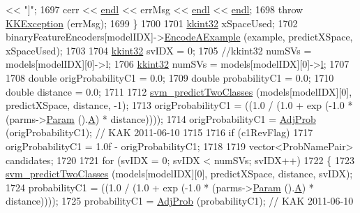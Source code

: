 \begin{DoxyCode}
       << \textcolor{stringliteral}{"]"};
1697     cerr << \hyperlink{namespace_k_k_b_ad1f50f65af6adc8fa9e6f62d007818a8}{endl} << errMsg << \hyperlink{namespace_k_k_b_ad1f50f65af6adc8fa9e6f62d007818a8}{endl} << \hyperlink{namespace_k_k_b_ad1f50f65af6adc8fa9e6f62d007818a8}{endl};
1698     \textcolor{keywordflow}{throw} \hyperlink{class_k_k_b_1_1_k_k_exception}{KKException} (errMsg);
1699   \}
1700 
1701   \hyperlink{namespace_k_k_b_a8fa4952cc84fda1de4bec1fbdd8d5b1b}{kkint32}  xSpaceUsed;
1702   binaryFeatureEncoders[modelIDX]->\hyperlink{class_k_k_m_l_l_1_1_feature_encoder_af82278dec57d34f3ebcf6ea97cc625d2}{EncodeAExample} (example, predictXSpace, xSpaceUsed);
1703 
1704   \hyperlink{namespace_k_k_b_a8fa4952cc84fda1de4bec1fbdd8d5b1b}{kkint32}  svIDX = 0;
1705   \textcolor{comment}{//kkint32  numSVs = models[modelIDX][0]->l;}
1706   \hyperlink{namespace_k_k_b_a8fa4952cc84fda1de4bec1fbdd8d5b1b}{kkint32}  numSVs = models[modelIDX][0]->\hyperlink{struct_s_v_m233_1_1_svm_model233_ae37947940a05ecebb1352b6f365b4050}{l};
1707 
1708   \textcolor{keywordtype}{double}  origProbabilityC1 = 0.0;
1709   \textcolor{keywordtype}{double}  probabilityC1     = 0.0;
1710   \textcolor{keywordtype}{double}  distance          = 0.0;
1711 
1712   \hyperlink{namespace_s_v_m233_a558a3dbd2873b3211831500197cc7a59}{svm\_predictTwoClasses} (models[modelIDX][0], predictXSpace, distance, -1);
1713   origProbabilityC1 = ((1.0 / (1.0 + exp (-1.0 * (parms->\hyperlink{class_k_k_m_l_l_1_1_binary_class_parms_a8b29f264963789ce9145e8baa589b088}{Param} ().\hyperlink{struct_s_v_m233_1_1svm__parameter_ae77c2459a4305fca375197165412abe2}{A}) * distance))));
1714   origProbabilityC1 = \hyperlink{_s_v_m_model_8cpp_a40759ba6dc57dc1b738f1440a39eda2b}{AdjProb} (origProbabilityC1);  \textcolor{comment}{// KAK 2011-06-10}
1715 
1716   \textcolor{keywordflow}{if}  (c1RevFlag)
1717     origProbabilityC1 = 1.0f - origProbabilityC1;
1718 
1719   vector<ProbNamePair>  candidates;
1720 
1721   \textcolor{keywordflow}{for}  (svIDX = 0;  svIDX < numSVs;  svIDX++)
1722   \{
1723     \hyperlink{namespace_s_v_m233_a558a3dbd2873b3211831500197cc7a59}{svm\_predictTwoClasses} (models[modelIDX][0], predictXSpace, distance, svIDX);
1724     probabilityC1 = ((1.0 / (1.0 + exp (-1.0 * (parms->\hyperlink{class_k_k_m_l_l_1_1_binary_class_parms_a8b29f264963789ce9145e8baa589b088}{Param} ().\hyperlink{struct_s_v_m233_1_1svm__parameter_ae77c2459a4305fca375197165412abe2}{A}) * distance))));
1725     probabilityC1 = \hyperlink{_s_v_m_model_8cpp_a40759ba6dc57dc1b738f1440a39eda2b}{AdjProb} (probabilityC1);  \textcolor{comment}{// KAK 2011-06-10}

\end{DoxyCode}
